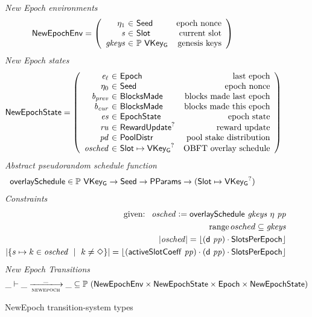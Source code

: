 \begin{figure}
  \emph{New Epoch environments}
  \begin{equation*}
    \NewEpochEnv =
    \left(
      \begin{array}{r@{~\in~}lr}
        \eta_1 & \Seed & \text{epoch nonce} \\
        \var{s} & \Slot & \text{current slot} \\
        \var{gkeys} & \powerset{\VKeyGen} & \text{genesis keys} \\
      \end{array}
    \right)
  \end{equation*}
  \emph{New Epoch states}
  \begin{equation*}
    \NewEpochState =
    \left(
      \begin{array}{r@{~\in~}lr}
        \var{e_\ell} & \Epoch & \text{last epoch} \\
        \eta_0 & \Seed & \text{epoch nonce} \\
        \var{b_{prev}} & \BlocksMade & \text{blocks made last epoch} \\
        \var{b_{cur}} & \BlocksMade & \text{blocks made this epoch} \\
        \var{es} & \EpochState & \text{epoch state} \\
        \var{ru} & \RewardUpdate^? & \text{reward update} \\
        \var{pd} & \PoolDistr & \text{pool stake distribution} \\
        \var{osched} & \Slot\mapsto\VKeyGen^? & \text{OBFT overlay schedule} \\
      \end{array}
    \right)
  \end{equation*}
  \emph{Abstract pseudorandom schedule function}
  \begin{align*}
    & \mathsf{overlaySchedule} \in \mathbb{P}~\mathsf{VKey_G} \to \mathsf{Seed} \to \mathsf{PParams}
        \to (\mathsf{Slot}\mapsto\mathsf{VKey_G}^?) \\
  \end{align*}
  \emph{Constraints}
  \begin{align*}
    \text{ given: }~\mathit{osched}\mathrel{\mathop:}=\mathsf{overlaySchedule}~\mathit{gkeys}~{\eta}~\mathit{pp} \\
    \operatorname{range}{osched}\subseteq\mathit{gkeys} \\
    |\mathit{osched}| = \lfloor(\mathsf{d}~\mathit{pp})\cdot\mathsf{SlotsPerEpoch}\rfloor \\
    |\{s\mapsto k\in\mathit{osched}~\mid~k\neq\Diamond\}| =
    \lfloor(\mathsf{activeSlotCoeff}~ \mathit{pp})\cdot(\mathsf{d}~\mathit{pp})\cdot\mathsf{SlotsPerEpoch}\rfloor \\
  \end{align*}
  \emph{New Epoch Transitions}
  \begin{equation*}
    \_ \vdash \var{\_} \trans{newepoch}{\_} \var{\_} \subseteq
    \powerset (\NewEpochEnv \times \NewEpochState \times \Epoch \times \NewEpochState)
  \end{equation*}
  \caption{NewEpoch transition-system types}
  \label{fig:ts-types:newepoch}
\end{figure}

